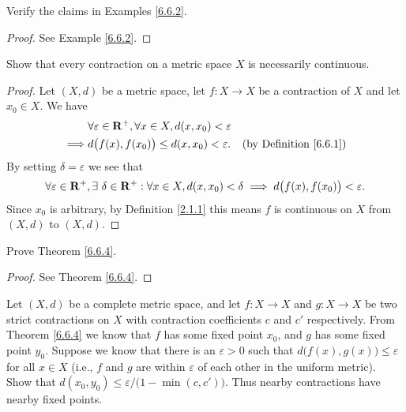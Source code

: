 \begin{exercise}\label{ex 6.6.5}
    Verify the claims in Examples \ref{6.6.2}.
\end{exercise}

\begin{proof}
    See Example \ref{6.6.2}.
\end{proof}

\begin{exercise}\label{ex 6.6.6}
    Show that every contraction on a metric space \(X\) is necessarily continuous.
\end{exercise}

\begin{proof}
    Let \((X, d)\) be a metric space, let \(f : X \to X\) be a contraction of \(X\) and let \(x_0 \in X\).
    We have
    \begin{align*}
                 & \forall \varepsilon \in \mathbf{R}^+, \forall x \in X, d(x, x_0) < \varepsilon                                      \\
        \implies & d\big(f(x), f(x_0)\big) \leq d(x, x_0) < \varepsilon.                  & \text{(by Definition \ref{6.6.1})}
    \end{align*}
    By setting \(\delta = \varepsilon\) we see that
    \[
        \forall \varepsilon \in \mathbf{R}^+, \exists\ \delta \in \mathbf{R}^+ : \forall x \in X, d(x, x_0) < \delta \implies d\big(f(x), f(x_0)\big) < \varepsilon.
    \]
    Since \(x_0\) is arbitrary, by Definition \ref{2.1.1} this means \(f\) is continuous on \(X\) from \((X, d)\) to \((X, d)\).
\end{proof}

\begin{exercise}\label{ex 6.6.7}
    Prove Theorem \ref{6.6.4}.
\end{exercise}

\begin{proof}
    See Theorem \ref{6.6.4}.
\end{proof}

\begin{exercise}\label{ex 6.6.8}
    Let \((X, d)\) be a complete metric space, and let \(f : X \to X\) and \(g : X \to X\) be two strict contractions on \(X\) with contraction coefficients \(c\) and \(c'\) respectively.
    From Theorem \ref{6.6.4} we know that \(f\) has some fixed point \(x_0\), and \(g\) has some fixed point \(y_0\).
    Suppose we know that there is an \(\varepsilon > 0\) such that \(d\big(f(x), g(x)\big) \leq \varepsilon\) for all \(x \in X\)
    (i.e., \(f\) and \(g\) are within \(\varepsilon\) of each other in the uniform metric).
    Show that \(d(x_0, y_0) \leq \varepsilon / \big(1 - \min(c, c')\big)\).
    Thus nearby contractions have nearby fixed points.
\end{exercise}

